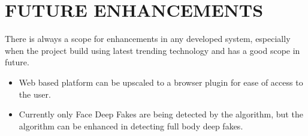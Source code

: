 
\section{FUTURE ENHANCEMENTS}
There is always a scope for enhancements in any developed system, especially
when the project build using latest trending technology and has a good scope in
future.
\begin{itemize}
    \item Web based platform can be upscaled to a browser plugin for ease of access to
          the user.
    \item Currently only Face Deep Fakes are being detected by the algorithm, but the
          algorithm can be enhanced in detecting full body deep fakes.
\end{itemize}
